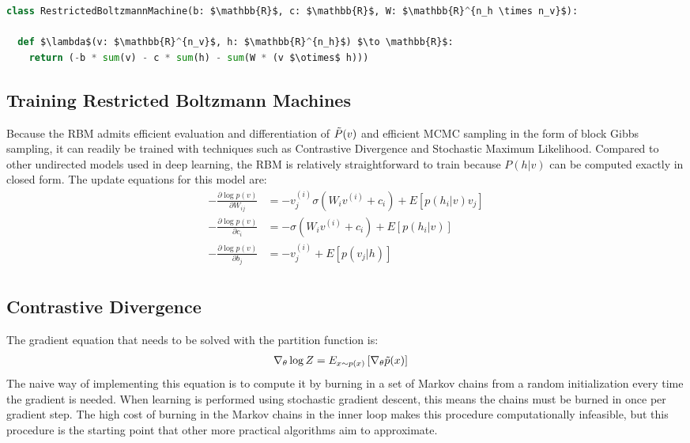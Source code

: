 \documentclass[book.tex]{subfiles}
\begin{document}
\begin{lstlisting}[language=python]
class RestrictedBoltzmannMachine(b: $\mathbb{R}$, c: $\mathbb{R}$, W: $\mathbb{R}^{n_h \times n_v}$):

  def $\lambda$(v: $\mathbb{R}^{n_v}$, h: $\mathbb{R}^{n_h}$) $\to \mathbb{R}$:
    return (-b * sum(v) - c * sum(h) - sum(W * (v $\otimes$ h)))
\end{lstlisting}

\subsection{Training Restricted Boltzmann Machines}
Because the RBM admits efficient evaluation and differentiation of $\Tilde{P}(v)$ and efficient MCMC sampling in the form of block Gibbs sampling, it can readily be trained with techniques such as Contrastive Divergence and Stochastic Maximum Likelihood. Compared to other undirected models used in deep learning, the RBM is relatively straightforward to train because $P(h|v)$ can be computed exactly in closed form. The update equations for this model are:
\begin{align}
    -\frac{\partial \log p(v)}{\partial W_{ij}} &= -v_j^{(i)}\sigma(W_iv^{(i)}+c_i)+E[p(h_i|v)v_j]
    \label{weights1} \\
    -\frac{\partial \log p(v)}{\partial c_i} &= -\sigma(W_iv^{(i)}+c_i)+E[p(h_i|v)]
    \label{weights2} \\
    -\frac{\partial \log p(v)}{\partial b_j} &= -v_j^{(i)}+E[p(v_j|h)]
    \label{weights3} \\
\end{align}

\subsection{Contrastive Divergence}
The gradient equation that needs to be solved with the partition function is:
\begin{align}
    \nabla_\theta \log Z &= E_{x\sim p(x)} \left [ \nabla_\theta \Tilde{p}(x) \right ]
\end{align}
The naive way of implementing this equation is to compute it by burning in a set of Markov chains from a random initialization every time the gradient is needed. When learning is performed using stochastic gradient descent, this means the chains must be burned in once per gradient step. The high cost of burning in the Markov chains in the inner loop makes this procedure computationally infeasible, but this procedure is the starting point that other more practical algorithms aim to approximate. 
\end{document}
